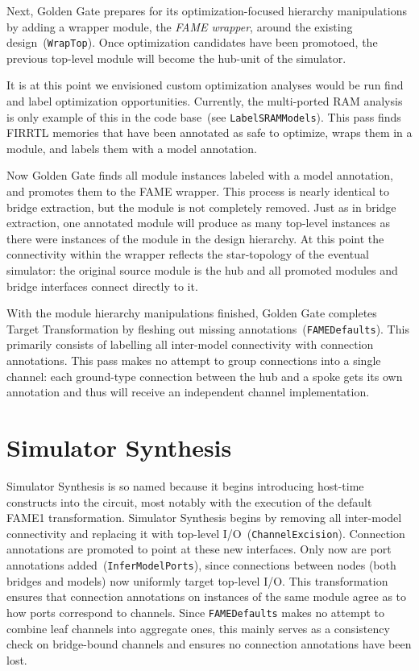 Next, Golden Gate prepares for its optimization-focused hierarchy manipulations
by adding a wrapper module, the \emph{FAME wrapper}, around the existing
design~(\texttt{WrapTop}). Once optimization candidates have been promotoed, the
previous top-level module will become the hub-unit of the simulator.

It is at this point we envisioned custom optimization analyses would be run
find and label optimization opportunities. Currently, the multi-ported RAM
analysis is only example of this in the code base~(see
\texttt{LabelSRAMModels}).  This pass finds FIRRTL memories that have been
annotated as safe to optimize, wraps them in a module, and labels them with a
model annotation.

Now Golden Gate finds all module instances labeled with a model annotation, and
promotes them to the FAME wrapper. This process is nearly identical
to bridge extraction, but the module is not completely removed. Just as in
bridge extraction, one annotated module will produce as many top-level instances
as there were instances of the module in the design hierarchy.  At this point
the connectivity within the wrapper reflects the star-topology of the eventual
simulator: the original source module is the hub and all promoted modules and
bridge interfaces connect directly to it.

With the module hierarchy manipulations finished, Golden Gate completes Target
Transformation by fleshing out missing annotations~(\texttt{FAMEDefaults}). This primarily consists of labelling
all inter-model connectivity with connection annotations. This pass makes no
attempt to group connections into a single channel: each ground-type
connection between the hub and a spoke gets its own annotation and thus will receive an independent channel implementation.

\section{Simulator Synthesis}

Simulator Synthesis is so named because it begins introducing host-time constructs into the circuit,
most notably with the execution of the default FAME1 transformation. Simulator
Synthesis begins by removing all inter-model connectivity and replacing it
with top-level I/O~(\texttt{ChannelExcision}). Connection annotations are
promoted to point at these new interfaces. Only now are port annotations
added~(\texttt{InferModelPorts}), since connections between nodes (both bridges and models)
now uniformly target top-level I/O.  This transformation
ensures that connection annotations on instances of the same module agree as to how
ports correspond to channels. Since \texttt{FAMEDefaults} makes no attempt to
combine leaf channels into aggregate ones, this mainly serves as a consistency check on
bridge-bound channels and ensures no connection annotations have been lost.

